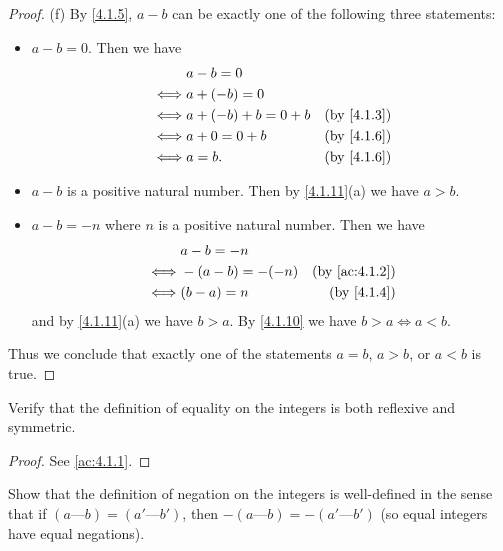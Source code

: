 \begin{proof}{(f)}
  By \cref{4.1.5}, \(a - b\) can be exactly one of the following three statements:
  \begin{itemize}
    \item \(a - b = 0\).
          Then we have
          \begin{align*}
                 & a - b = 0                                       \\
            \iff & a + (-b) = 0                                    \\
            \iff & a + (-b) + b = 0 + b & \text{(by \cref{4.1.3})} \\
            \iff & a + 0 = 0 + b        & \text{(by \cref{4.1.6})} \\
            \iff & a = b.               & \text{(by \cref{4.1.6})}
          \end{align*}
    \item \(a - b\) is a positive natural number.
          Then by \cref{4.1.11}(a) we have \(a > b\).
    \item \(a - b = -n\) where \(n\) is a positive natural number.
          Then we have
          \begin{align*}
                 & a - b = -n                                     \\
            \iff & -(a - b) = -(-n) & \text{(by \cref{ac:4.1.2})} \\
            \iff & (b - a) = n      & \text{(by \cref{4.1.4})}
          \end{align*}
          and by \cref{4.1.11}(a) we have \(b > a\).
          By \cref{4.1.10} we have \(b > a \iff a < b\).
  \end{itemize}
  Thus we conclude that exactly one of the statements \(a = b\), \(a > b\), or \(a < b\) is true.
\end{proof}

\exercisesection

\begin{ex}\label{ex:4.1.1}
  Verify that the definition of equality on the integers is both reflexive and symmetric.
\end{ex}

\begin{proof}
  See \cref{ac:4.1.1}.
\end{proof}

\begin{ex}\label{ex:4.1.2}
  Show that the definition of negation on the integers is well-defined in the sense that if \((a \text{---} b) = (a' \text{---} b')\), then \(-(a \text{---} b) = -(a' \text{---} b')\)
  (so equal integers have equal negations).
\end{ex}

